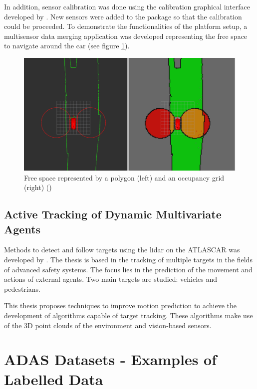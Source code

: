 In addition, sensor calibration was done using the calibration graphical interface developed by \cite{VieiradaSilva2016}. New sensors were added to the package so that the calibration could be proceeded. To demonstrate the functionalities of the platform setup, a multisensor data merging application was developed representing the free space to navigate around the car (see figure \ref{fig:diogo}).

\begin{figure}[htp]
	
	\centering
	\includegraphics[width=1\textwidth]{capstate/imgs/diogo.png}
	
	\caption{Free space represented by a polygon (left) and an occupancy grid (right) (\cite{Correia2017})}
	\label{fig:diogo}
	
\end{figure}

\subsection{Active Tracking of Dynamic Multivariate Agents} 

Methods to detect and follow targets using the \gls{lidar} on the ATLASCAR was developed by  \cite{SoaresDeAlmeida2016a}. The thesis is based in the tracking of multiple targets in the fields of advanced safety systems. The focus lies in the prediction of the movement and actions of external agents. Two main targets are studied: vehicles and pedestrians. 

This thesis proposes techniques to improve motion prediction to achieve the development of algorithms capable of target tracking. These algorithms make use of the 3D point clouds of the environment and vision-based sensors. 

\section{ADAS Datasets - Examples of Labelled Data}

